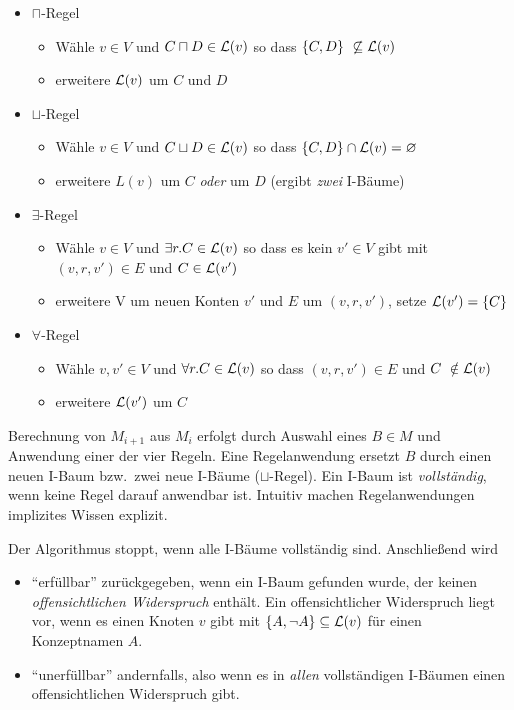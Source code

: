 \begin{itemize}
\item $\sqcap$-Regel
  \begin{itemize}
  \item
    Wähle $v \in V$ und $C \sqcap D \in \ML\left( v \right)$ so dass
    $\left\{ C,D \right\}\  \not\subseteq \ML\left( v \right)$
  \item
    erweitere $\mathcal{L}(v)$ um $C$ und $D$
  \end{itemize}
\item $\sqcup$-Regel

  \begin{itemize}
  \item
    Wähle $v \in V$ und $C \sqcup D \in \ML\left( v \right)$ so dass
    $\left\{ C,D \right\} \cap \ML\left( v \right) = \emptyset$
  \item
      erweitere $L(v)$ um $C$ \emph{oder} um $D$ (ergibt \emph{zwei} I-Bäume)
  \end{itemize}
\item $\exists$-Regel

  \begin{itemize}
  \item
    Wähle $v \in V$ und $\exists r.C \in \ML\left( v \right)$ so dass
    es kein $v' \in V$ gibt mit $\left( v,r,v' \right) \in E$
    und $C \in \ML\left( v' \right)$
  \item
    erweitere V um neuen Konten $v'$ und $E$ um
    $\left( v,r,v' \right)$, setze
    $\ML\left( v' \right) = \left\{ C \right\}$
  \end{itemize}
\item $\forall$-Regel
  \begin{itemize}
  \item
    Wähle $v,v' \in V$ und $\forall r.C \in \ML\left( v \right)$ so
    dass $\left( v,r,v' \right) \in E$ und
    $C\  \notin \ML\left( v \right)$
  \item
    erweitere $\mathcal{L}(v')$ um $C$
  \end{itemize}
\end{itemize}

Berechnung von $M_{i + 1}$ aus $M_i$ erfolgt durch Auswahl eines $B \in M$ und
Anwendung einer der vier Regeln. Eine Regelanwendung ersetzt $B$ durch einen
neuen I-Baum bzw.\ zwei neue I-Bäume ($\sqcup$-Regel). Ein I-Baum ist \emph{vollständig}, wenn keine Regel darauf anwendbar ist. Intuitiv machen Regelanwendungen implizites Wissen explizit.

Der Algorithmus stoppt, wenn alle I-Bäume vollständig sind. Anschließend wird
\begin{itemize}
    \item \enquote{erfüllbar} zurückgegeben, wenn ein I-Baum gefunden wurde, der keinen \emph{offensichtlichen Widerspruch} enthält. Ein offensichtlicher Widerspruch liegt vor, wenn es einen Knoten $v$ gibt mit $\left\{A, \neg A\right\} \subseteq \ML(v)$ für einen Konzeptnamen $A$.
    \item \enquote{unerfüllbar} andernfalls, also wenn es in \emph{allen} vollständigen I-Bäumen einen offensichtlichen Widerspruch gibt.
\end{itemize}

